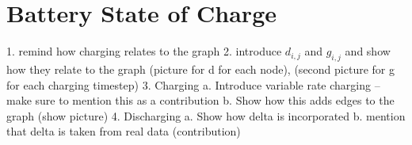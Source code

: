 \section{Battery State of Charge}
1. remind how charging relates to the graph 
2. introduce $d_{i,j}$ and $g_{i,j}$ and show how they relate to the graph (picture for d for each node), (second picture for g for each charging timestep)
3. Charging
    a. Introduce variable rate charging -- make sure to mention this as a contribution
    b. Show how this adds edges to the graph (show picture)
4. Discharging
    a. Show how delta is incorporated
    b. mention that delta is taken from real data (contribution)
    
